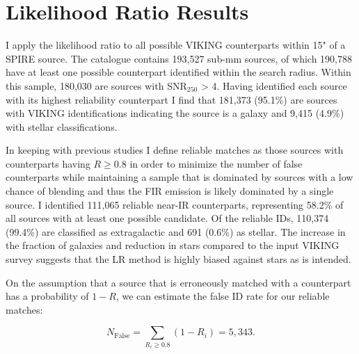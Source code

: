 \section{Likelihood Ratio Results}
\label{sec:lr_results}

I apply the likelihood ratio to all possible VIKING counterparts within 15" of a SPIRE source. The catalogue contains 193,527 sub-mm sources, of which 190,788 have at least one possible counterpart identified within the search radius. Within this sample, 180,030 are sources with SNR$_{250}$ > 4. Having identified each source with its highest reliability counterpart I find that 181,373 (95.1\%) are sources with VIKING identifications indicating the source is a galaxy and 9,415 (4.9\%) with stellar classifications. 

In keeping with previous studies I define reliable matches as those sources with counterparts having $R \geq 0.8$ in order to minimize the number of false counterparts while maintaining a sample that is dominated by sources with a low chance of blending and thus the FIR emission is likely dominated by a single source. I identified 111,065 reliable near-IR counterparts, representing 58.2\% of all sources with at least one possible candidate. Of the reliable IDs, 110,374 (99.4\%) are classified as extragalactic and 691 (0.6\%) as stellar. The increase in the fraction of galaxies and reduction in stars compared to the input VIKING survey suggests that the LR method is highly biased against stars as is intended.

On the assumption that a source that is erroneously matched with a counterpart has a probability of $1 - R$, we can estimate the false ID rate for our reliable matches:

\begin{equation}
    N_{\textrm{False}} = \sum_{R_i \geq 0.8} (1 - R_i) = 5,343.
\label{eq:false_ids}
\end{equation}

